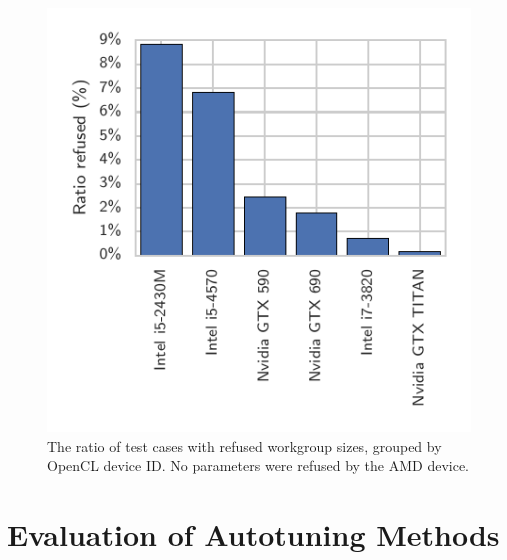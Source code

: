 \documentclass[preprint,nonatbib,10pt]{sigplanconf}
\begin{document}
\begin{figure}
  \centering
  \vspace{-2em}
  \includegraphics[width=.6\columnwidth]{refused_params_by_device}
  \vspace{-1.5em}
  \caption{%
    The ratio of test cases with refused workgroup
    sizes, grouped by OpenCL device ID. No parameters were refused by
    the AMD device.
    \vspace{-1em}
  }
\label{fig:refused-params}
\end{figure}


\section{Evaluation of Autotuning Methods}\label{sec:evaluation}
\end{document}
